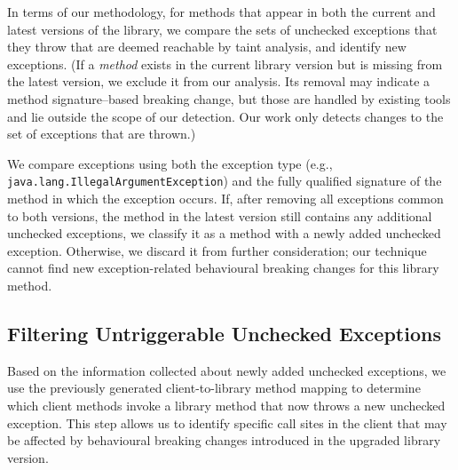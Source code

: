 

In terms of our methodology, for methods that appear in both the current and latest versions of the library, we compare the sets of unchecked exceptions that they throw that are deemed reachable by taint analysis, and identify new exceptions. (If a \emph{method} exists in the current library version but is missing from the latest version, we exclude it from our analysis. Its removal may indicate a method signature–based breaking change, but those are handled by existing tools and lie outside the scope of our detection. Our work only detects changes to the set of exceptions that are thrown.)

We compare exceptions using both the exception type (e.g., \texttt{java.lang.IllegalArgumentException}) and the fully qualified signature of the method in which the exception occurs. If, after removing all exceptions common to both versions, the method in the latest version still contains any additional unchecked exceptions, we classify it as a method with a newly added unchecked exception. Otherwise, we discard it from further consideration; our technique cannot find new exception-related behavioural breaking changes for this library method.

\subsection{Filtering Untriggerable Unchecked Exceptions}

Based on the information collected about newly added unchecked exceptions, we use the previously generated client-to-library method mapping to determine which client methods invoke a library method that now throws a new unchecked exception. This step allows us to identify specific call sites in the client that may be affected by behavioural breaking changes introduced in the upgraded library version.

